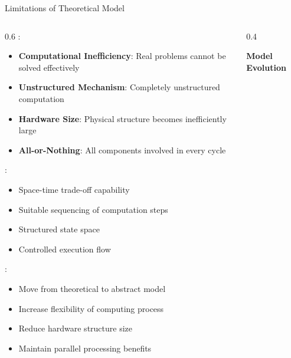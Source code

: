\begin{frame}{Limitations of Theoretical Model}
\begin{columns}
\begin{column}{0.6\textwidth}
:
\begin{itemize}
\item \textbf{Computational Inefficiency}: Real problems cannot be solved effectively
\item \textbf{Unstructured Mechanism}: Completely unstructured computation
\item \textbf{Hardware Size}: Physical structure becomes inefficiently large
\item \textbf{All-or-Nothing}: All components involved in every cycle
\end{itemize}

\vspace{0.3cm}
:
\begin{itemize}
\item Space-time trade-off capability
\item Suitable sequencing of computation steps
\item Structured state space
\item Controlled execution flow
\end{itemize}

\vspace{0.3cm}
:
\begin{itemize}
\item Move from theoretical to abstract model
\item Increase flexibility of computing process
\item Reduce hardware structure size
\item Maintain parallel processing benefits
\end{itemize}
\end{column}
\begin{column}{0.4\textwidth}
\begin{center}
\textbf{Model Evolution}
\vspace{0.3cm}

\end{center}
\end{column}
\end{columns}
\end{frame}

